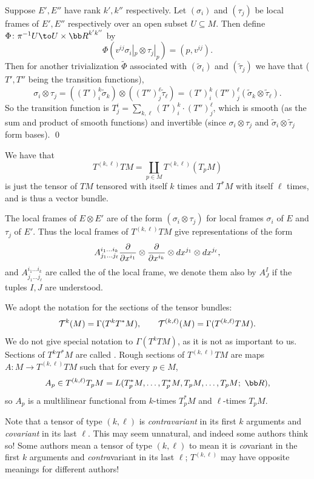     Suppose $E',E''$ have rank $k',k''$ respectively.
    Let $(\sigma_i)$ and $(\tau_j)$ be local frames of $E',E''$ respectively over an open subset $U\subseteq M$.
    Then define $\Phi\colon\pi^{-1}U\to U\times\bR^{k'k''}$ by
    $$ \Phi(v^{ij}\sigma_i|_p\otimes\tau_j|_p) = (p,v^{ij}) . $$
    Then for another trivialization $\tilde\Phi$ associated with $(\tilde\sigma_i)$ and $(\tilde\tau_j)$ we have that ($T',T''$ being the transition functions),
    $$ \sigma_i\otimes\tau_j = ((T')^k_i\tilde\sigma_k)\otimes((T'')^\ell_j\tilde\tau_\ell) = (T')^k_i(T'')^\ell_j(\tilde\sigma_k\otimes\tilde\tau_\ell) . $$
    So the transition function is $T^i_j=\sum_{k,\ell}(T')^k_i\cdot(T'')^\ell_j$, which is smooth (as the sum and product of smooth functions) and invertible
    (since $\sigma_i\otimes\tau_j$ and $\tilde\sigma_i\otimes\tilde\tau_j$ form bases).
    \qed

\eproof

We have that
$$ T^{(k,\ell)}TM = \coprod_{p\in M}T^{(k,\ell)}(T_pM) $$
is just the tensor of $TM$ tensored with itself $k$ times and $T^*M$ with itself $\ell$ times, and is thus a vector bundle.

The local frames of $E\otimes E'$ are of the form $(\sigma_i\otimes\tau_j)$ for local frames $\sigma_i$ of $E$ and $\tau_j$ of $E'$.
Thus the local frames of $T^{(k,\ell)}TM$ give representations of the form
$$ A^{i_1\dots i_k}_{j_1\dots j_\ell}{{\partial }\over{\partial x^{i_1}}}\otimes{{\partial }\over{\partial x^{i_k}}}\otimes dx^{j_1}\otimes dx^{j_\ell} , $$
and $A^{i_1\dots i_k}_{j_1\dots j_\ell}$ are called the  of the local frame, we denote them also by $A^I_J$ if the tuples $I,J$ are understood.

We adopt the notation for the sections of the tensor bundles:
$$ {{\cal T}}^k(M) = \Gamma(T^kT^*M),\qquad {{\cal T}}^{(k,\ell)}(M) = \Gamma(T^{(k,\ell)}TM) . $$
We do not give special notation to $\Gamma(T^kTM)$, as it is not as important to us.
Sections of $T^kT^*M$ are called .
Rough sections of $T^{(k,\ell)}TM$ are maps $A\colon M\to T^{(k,\ell)}TM$ such that for every $p\in M$,
$$ A_p\in T^{(k,\ell)}T_pM = L(T_p^*M,\dots,T_p^*M,T_pM,\dots,T_pM;\ \bR) , $$
so $A_p$ is a multlilinear functional from $k$-times $T_p^*M$ and $\ell$-times $T_pM$.

\bnote

    Note that a tensor of type $(k,\ell)$ is {\it contravariant\/} in its first $k$ arguments and {\it covariant\/} in its last $\ell$.
    This may seem unnatural, and indeed some authors think so!
    Some authors mean a tensor of type $(k,\ell)$ to mean it is {\it co}variant in the first $k$ arguments and {\it contra}variant in its last
    $\ell$; $T^{(k,\ell)}$ may have opposite meanings for different authors!

